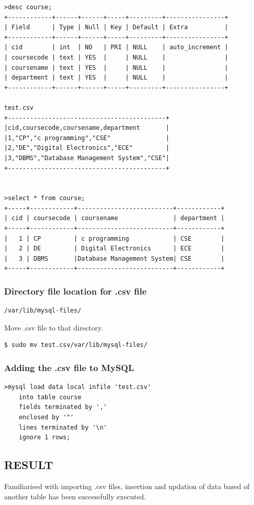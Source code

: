 \documentclass{article}
\begin{document}
\begin{verbatim}
>desc course;
+------------+------+------+-----+---------+----------------+
| Field      | Type | Null | Key | Default | Extra          |
+------------+------+------+-----+---------+----------------+
| cid        | int  | NO   | PRI | NULL    | auto_increment |
| coursecode | text | YES  |     | NULL    |                |
| coursename | text | YES  |     | NULL    |                |
| department | text | YES  |     | NULL    |                |
+------------+------+------+-----+---------+----------------+

test.csv
+-------------------------------------------+
|cid,coursecode,coursename,department       |
|1,"CP","c programming","CSE"               |
|2,"DE","Digital Electronics","ECE"         |
|3,"DBMS","Database Management System","CSE"|
+-------------------------------------------+


>select * from course;
+-----+------------+--------------------------+------------+
| cid | coursecode | coursename               | department |
+-----+------------+--------------------------+------------+
|   1 | CP         | c programming            | CSE        |
|   2 | DE         | Digital Electronics      | ECE        |
|   3 | DBMS       |Database Management System| CSE        |
+-----+------------+--------------------------+------------+
\end{verbatim}
\newpage
\begin{flushleft}
\subsubsection{Directory file location for .csv file}
 \begin{verbatim}/var/lib/mysql-files/\end{verbatim}

Move .csv file to that directory.
\begin{verbatim}$ sudo mv test.csv/var/lib/mysql-files/\end{verbatim}
\subsubsection{Adding the .csv file to MySQL}
\begin{verbatim}>mysql load data local infile 'test.csv'
    into table course
    fields terminated by ',' 
    enclosed by '"'
    lines terminated by '\n'
    ignore 1 rows;\end{verbatim}
\subsection{RESULT}
Familiarised with importing .csv files, insertion and updation of data based of another table has been successfully executed.
\end{flushleft}
\end{document}
